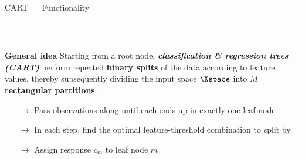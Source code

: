 \documentclass[11pt,compress,t,notes=noshow, xcolor=table]{beamer}
\begin{document}
\LARGE
\begin{frame}{\textcolor{gray!80}{CART} ~~ Functionality}
\normalsize
\vspace{-0.5cm}
\noindent \textcolor{gray!80}{\rule{\textwidth}{1pt}}

\vspace{0.2cm}

\scriptsize

\colorbox{gray!80}{\textcolor{white}{SUPERVISED}} 
\colorbox{gray!80}{\textcolor{white}{NON-PARAMETRIC}} 
\colorbox{gray!80}{\textcolor{white}{WHITE-BOX}} 
\colorbox{gray!80}{\textcolor{white}{FEATURE SELECTION}}

\medskip

\textbf{\textcolor{gray!80}{General idea}} {}{} Starting from a root node, 
\textit{\textbf{classification \& regression trees (CART)}} 
perform repeated \textbf{binary splits} of the data according to feature values, 
thereby subsequently dividing the input space $\Xspace$ into $M$ 
\textbf{rectangular partitions}.

\begin{itemize}
  \item [$\rightarrow$] Pass observations along until each ends up in exactly 
  one leaf node
  \item [$\rightarrow$] In each step, find the optimal feature-threshold
  combination to split by
  \item [$\rightarrow$] Assign response $c_m$ to leaf node $m$
\end{itemize}

\vspace{0.1cm}


\end{frame}
\end{document}
